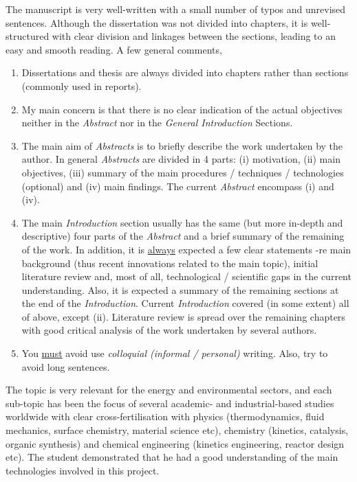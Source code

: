 \documentclass[14pt,twoside]{report}
\begin{document}
The manuscript is very well-written with a small number of typos and unrevised sentences. Although the dissertation was not divided into chapters, it is well-structured with clear division and linkages between the sections, leading to an easy and smooth reading. A few general comments,
\begin{enumerate}
%
\item Dissertations and thesis are always divided into chapters rather than sections (commonly used in reports). 
%
\item My main concern is that there is no clear indication of the actual objectives neither in the {\it Abstract} nor in the {\it General Introduction} Sections.
%
\item The main aim of {\it Abstracts} is to briefly describe the work undertaken by the author. In general {\it Abstracts} are divided in 4 parts: (i) motivation, (ii) main objectives, (iii) summary of the main procedures / techniques / technologies (optional) and (iv) main findings. The current {\it Abstract} encompass (i) and (iv). 
%
\item The main {\it Introduction} section usually has the same (but more in-depth and descriptive) four parts of the {\it Abstract} and a brief summary of the remaining of the work. In addition, it is \underline{always} expected a few clear statements -re main background (thus recent innovations related to the main topic), initial literature review and, most of all, technological / scientific gaps in the current understanding. Also, it is expected a summary of the remaining sections at the end of the {\it Introduction}.  Current {\it Introduction} covered (in some extent) all of above, except (ii). Literature review is spread over the remaining chapters with good critical analysis of the work undertaken by several authors. 
%
\item You \underline{must} avoid use {\it colloquial (informal / personal)} writing. Also, try to avoid long sentences.
%
\end{enumerate}

The topic is very relevant for the energy and environmental sectors, and each sub-topic has been the focus of several academic- and industrial-based studies worldwide with clear cross-fertilisation with physics (thermodynamics, fluid mechanics, surface chemistry, material science etc), chemistry (kinetics, catalysis, organic synthesis) and chemical engineering (kinetics engineering, reactor design etc). The student demonstrated that he had a good understanding of the main technologies involved in this project.
\end{document}
